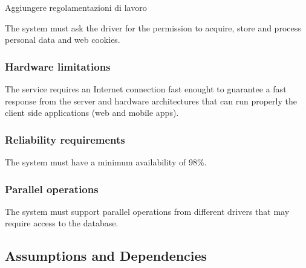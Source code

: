 Aggiungere regolamentazioni di lavoro

The system must ask the driver for the permission to acquire, store and process personal data and web cookies.

\subsubsection{Hardware limitations}
The service requires an Internet connection fast enought to guarantee a fast response from the server and hardware architectures that can run properly the client side applications (web and mobile apps).

\subsubsection{Reliability requirements}
The system must have a minimum availability of 98\%.

\subsubsection{Parallel operations}
The system must support parallel operations from different drivers that may require access to the database.

\subsection{Assumptions and Dependencies}


